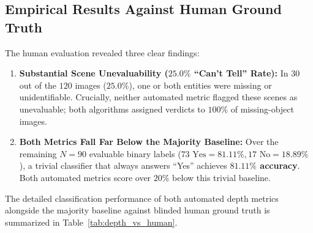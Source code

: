 \documentclass[10pt,twocolumn,letterpaper]{article}
\begin{document}
\subsection{Empirical Results Against Human Ground Truth}
The human evaluation revealed three clear findings:

\begin{enumerate}
    \item \textbf{Substantial Scene Unevaluability ($25.0\%$ ``Can't Tell'' Rate):} In $30$ out of the $120$ images ($25.0\%$), one or both entities were missing or unidentifiable. Crucially, neither automated metric flagged these scenes as unevaluable; both algorithms assigned verdicts to $100\%$ of missing-object images.
    \item \textbf{Both Metrics Fall Far Below the Majority Baseline:} Over the remaining $N = 90$ evaluable binary labels ($73\text{ Yes} = 81.11\%, 17\text{ No} = 18.89\%$), a trivial classifier that always answers ``Yes'' achieves \textbf{$81.11\%$ accuracy}. Both automated metrics score over $20\%$ below this trivial baseline.
\end{enumerate}

The detailed classification performance of both automated depth metrics alongside the majority baseline against blinded human ground truth is summarized in Table~\ref{tab:depth_vs_human}.

\begin{table}[t]
\centering
\caption{Classification performance of automated depth metrics against blinded human ground-truth labels ($N = 90$ evaluable items).}
\label{tab:depth_vs_human}
\small
{}
\end{table}
\end{document}

